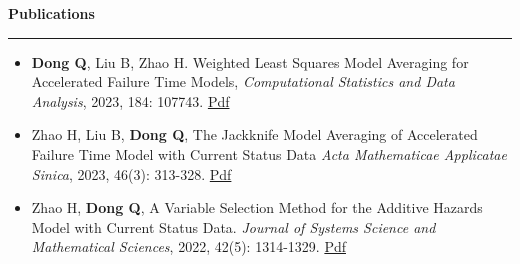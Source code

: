\documentclass[a4paper,10pt]{article}
\newcommand{\resheading}[1]{
  \vspace{8pt}
  \noindent\textbf{\large #1}
  \vspace{4pt}
  \hrule
  \vspace{8pt}
}
\begin{document}
\resheading{Publications}
\begin{itemize}[left=0pt, label={}]
\item \textbf{Dong Q}, Liu B, Zhao H. Weighted Least Squares Model Averaging for Accelerated Failure Time Models,  \emph{Computational Statistics and Data Analysis}, 2023, 184: 107743. \href{https://dqksnow.github.io/pdfs/dong2023weighted.pdf}{Pdf}
  
\item Zhao H, Liu B, \textbf{Dong Q}, The Jackknife Model Averaging of Accelerated Failure Time Model with Current Status Data \emph{Acta Mathematicae Applicatae Sinica}, 2023, 46(3): 313-328. \href{https://dqksnow.github.io/pdfs/zhao2023jackknife.pdf}{Pdf}
  
\item Zhao H, \textbf{Dong Q}, A Variable Selection Method for the Additive Hazards Model with Current Status Data. \emph{Journal of Systems Science and Mathematical Sciences}, 2022, 42(5): 1314-1329. \href{https://dqksnow.github.io/pdfs/hui2022variable.pdf}{Pdf}
  
\end{itemize}
\end{document}
